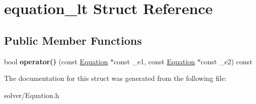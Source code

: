 \hypertarget{structequation__lt}{\section{equation\-\_\-lt \-Struct \-Reference}
\label{structequation__lt}
}
\subsection*{\-Public \-Member \-Functions}
\begin{DoxyCompactItemize}
\item 
\hypertarget{structequation__lt_afa9c6862b5e09c5e15126715362c08df}{bool {\bfseries operator()} (const \hyperlink{classEquation}{\-Equation} $\ast$const \-\_\-e1, const \hyperlink{classEquation}{\-Equation} $\ast$const \-\_\-e2) const }\label{structequation__lt_afa9c6862b5e09c5e15126715362c08df}

\end{DoxyCompactItemize}


\-The documentation for this struct was generated from the following file\-:\begin{DoxyCompactItemize}
\item 
solver/\-Equation.\-h\end{DoxyCompactItemize}
